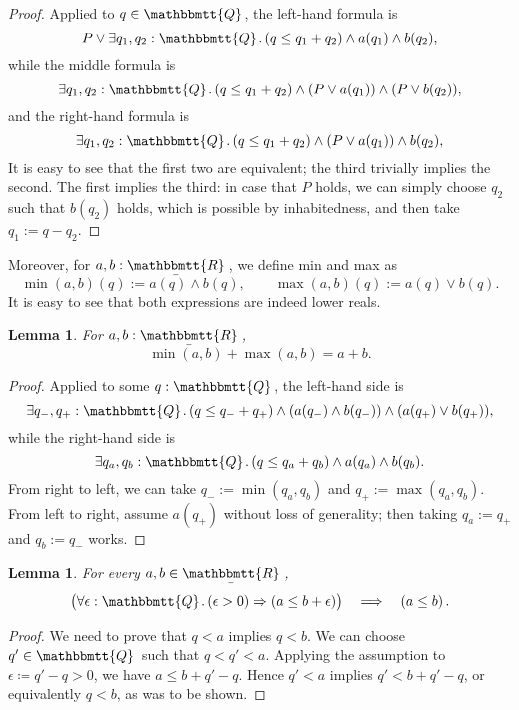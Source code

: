 \documentclass[11pt, oneside, article]{memoir}
\theoremstyle{plain}
\newtheorem{lemma}[theorem]{Lemma}
\theoremstyle{definition}
\theoremstyle{remark}
\newcommand{\ubar}[1]{\underaccent{\bar}{#1}}
\newcommand{\internal}[1]{\raisebox{-.03ex}{$\mathbbmtt{#1}$}}
\newcommand{\hs}{\hspace{1.1pt}}
\newcommand{\tQQ}{\internal{Q}\hs}
\newcommand{\tRR}{\internal{R}\hs}
\newcommand{\tLR}{\ubar{\tRR}\hs}
\newcommand{\imp}{\Rightarrow}
\begin{document}
\begin{proof}
	Applied to $q \in \tQQ$, the left-hand formula is
	\[
		P \lor \exists q_1, q_2  : \tQQ \ldotp (q \leq q_1 + q_2) \land a(q_1) \land b(q_2),
	\]
	while the middle formula is
	\[
		\exists q_1, q_2  : \tQQ \ldotp (q \leq q_1 + q_2) \land (P \lor a(q_1)) \land (P \lor b(q_2)),
	\]
	and the right-hand formula is
	\[
		\exists q_1, q_2  : \tQQ \ldotp (q \leq q_1 + q_2) \land (P \lor a(q_1)) \land b(q_2),
	\]
	It is easy to see that the first two are equivalent; the third trivially implies the second. The first implies the third: in case that $P$ holds, we can simply choose $q_2$ such that $b(q_2)$ holds, which is possible by inhabitedness, and then take $q_1 := q - q_2$.
\end{proof}

Moreover, for $a,b : \tLR$, we define min and max as
\[
	\min(a,b)(q) := a(q) \land b(q),\qquad	\max(a,b)(q) := a(q) \lor b(q).
\]
It is easy to see that both expressions are indeed lower reals.

\begin{lemma}
	\label{lem.max_min_LR}
	For $a,b : \tLR$,
	\[
		\min(a,b) + \max(a,b) = a + b.
	\]
\end{lemma}

\begin{proof}
	Applied to some $q : \tQQ$, the left-hand side is 	
	\[
			\exists q_-, q_+  : \tQQ \ldotp (q \leq q_- + q_+) \land (a(q_-) \land b(q_-)) \land (a(q_+) \lor b(q_+)),
	\]
	while the right-hand side is
	\[
			\exists q_a, q_b  : \tQQ \ldotp (q \leq q_a + q_b) \land a(q_a) \land b(q_b).
	\]
	From right to left, we can take $q_- := \min(q_a,q_b)$ and $q_+ := \max(q_a,q_b)$. From left to right, assume $a(q_+)$ without loss of generality; then taking $q_a := q_+$ and $q_b := q_-$ works.
\end{proof}

\begin{lemma}
	\label{lem:eps_order}
	For every $a,b\in\tLR$,
	\[
		\big(\forall \epsilon : \tQQ\ldotp (\epsilon > 0) \imp (a \leq b + \epsilon)\big) \quad \Longrightarrow \quad \left( a \leq b \right).
	\]
\end{lemma}

\begin{proof}
	We need to prove that $q < a$ implies $q < b$. We can choose $q' \in \tQQ$ such that $q < q' < a$. Applying the assumption to $\epsilon\coloneqq q' - q > 0$, we have $a \le b + q' - q$. Hence $q' < a$ implies $q' < b + q' - q$, or equivalently $q < b$, as was to be shown.
\end{proof}
\end{document}
